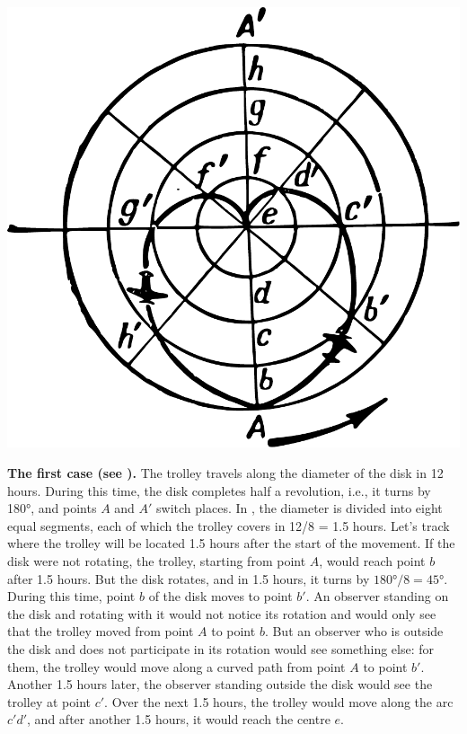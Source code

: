 \begin{marginfigure}%
\centering
\includegraphics[width=\textwidth]{figures/ch-09/fig-135.pdf}
\end{marginfigure}


\textbf{The first case (see ).} The trolley travels along the diameter of the disk in 12 hours. During this time, the disk completes half a revolution, i.e., it turns by \ang{180}, and points $A$ and $A'$ switch places. In , the diameter is divided into eight equal segments, each of which the trolley covers in 12/8 = 1.5 hours. Let's track where the trolley will be located 1.5 hours after the start of the movement. If the disk were not rotating, the trolley, starting from point $A$, would reach point $b$ after 1.5 hours. But the disk rotates, and in 1.5 hours, it turns by $\ang{180}/8 = \ang{45}$. During this time, point $b$ of the disk moves to point $b'$. An observer standing on the disk and rotating with it would not notice its rotation and would only see that the trolley moved from point $A$ to point $b$. But an observer who is outside the disk and does not participate in its rotation would see something else: for them, the trolley would move along a curved path from point $A$ to point $b'$. Another 1.5 hours later, the observer standing outside the disk would see the trolley at point $c'$. Over the next 1.5 hours, the trolley would move along the arc $c'd'$, and after another 1.5 hours, it would reach the centre $e$.

